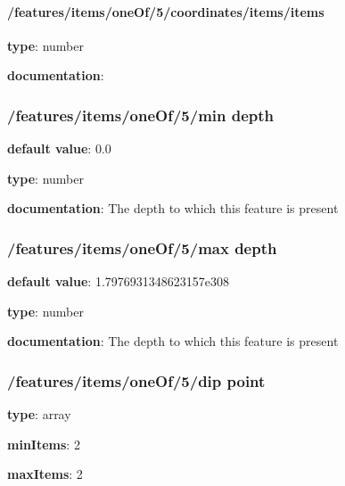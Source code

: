 \begin{itemized}
\begin{itemized}
\paragraph{/features/items/oneOf/5/coordinates/items/items} \begin{itemized}
\item {\bf type}: number
\end{itemized}\item {\bf documentation}: 
\end{itemized}\end{itemized}\subsubsection{/features/items/oneOf/5/min depth} \begin{itemized}
\item {\bf default value}: 0.0
\item {\bf type}: number
\item {\bf documentation}: The depth to which this feature is present
\end{itemized}\subsubsection{/features/items/oneOf/5/max depth} \begin{itemized}
\item {\bf default value}: 1.7976931348623157e308
\item {\bf type}: number
\item {\bf documentation}: The depth to which this feature is present
\end{itemized}\subsubsection{/features/items/oneOf/5/dip point} \begin{itemized}
\item {\bf type}: array
\item {\bf minItems}: 2
\item {\bf maxItems}: 2

\end{itemized}
